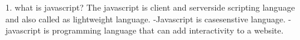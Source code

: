 1. what is javascript?
    The javascript is client and serverside scripting language and also called as lightweight language.
    -Javascript is casesenstive language.
    -javascript is programming language that can add interactivity to a website.